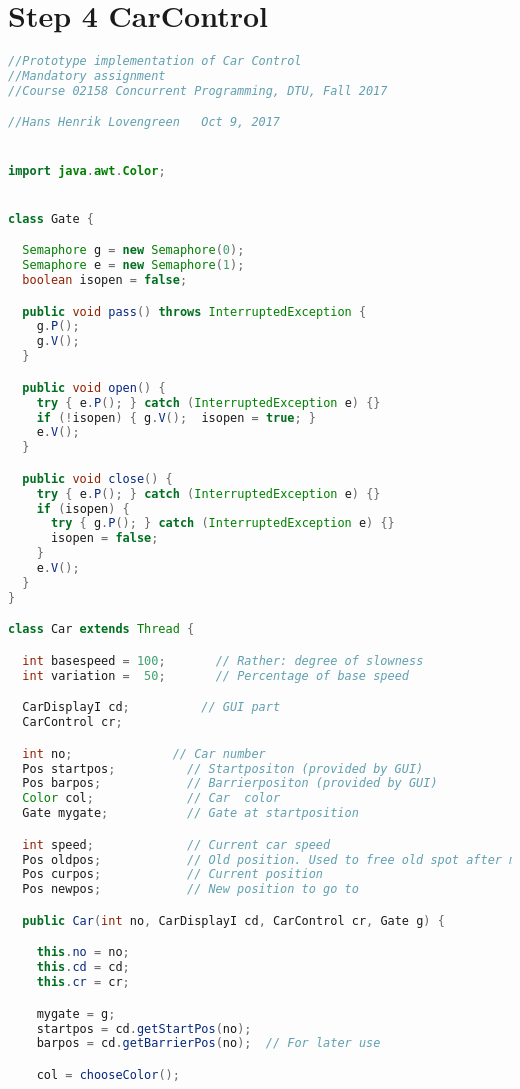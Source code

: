 \section*{Step 4 CarControl}
\begin{lstlisting}[language=java]
//Prototype implementation of Car Control
//Mandatory assignment
//Course 02158 Concurrent Programming, DTU, Fall 2017

//Hans Henrik Lovengreen   Oct 9, 2017


import java.awt.Color;


class Gate {

  Semaphore g = new Semaphore(0);
  Semaphore e = new Semaphore(1);
  boolean isopen = false;

  public void pass() throws InterruptedException {
    g.P(); 
    g.V();
  }

  public void open() {
    try { e.P(); } catch (InterruptedException e) {}
    if (!isopen) { g.V();  isopen = true; }
    e.V();
  }

  public void close() {
    try { e.P(); } catch (InterruptedException e) {}
    if (isopen) { 
      try { g.P(); } catch (InterruptedException e) {}
      isopen = false;
    }
    e.V();
  }
}

class Car extends Thread {

  int basespeed = 100;       // Rather: degree of slowness
  int variation =  50;       // Percentage of base speed

  CarDisplayI cd;          // GUI part
  CarControl cr;

  int no;              // Car number
  Pos startpos;          // Startpositon (provided by GUI)
  Pos barpos;            // Barrierpositon (provided by GUI)
  Color col;             // Car  color
  Gate mygate;           // Gate at startposition

  int speed;             // Current car speed
  Pos oldpos;            // Old position. Used to free old spot after move.
  Pos curpos;            // Current position 
  Pos newpos;            // New position to go to

  public Car(int no, CarDisplayI cd, CarControl cr, Gate g) {

    this.no = no;
    this.cd = cd;
    this.cr = cr;

    mygate = g;
    startpos = cd.getStartPos(no);
    barpos = cd.getBarrierPos(no);  // For later use

    col = chooseColor();


\end{lstlisting}

